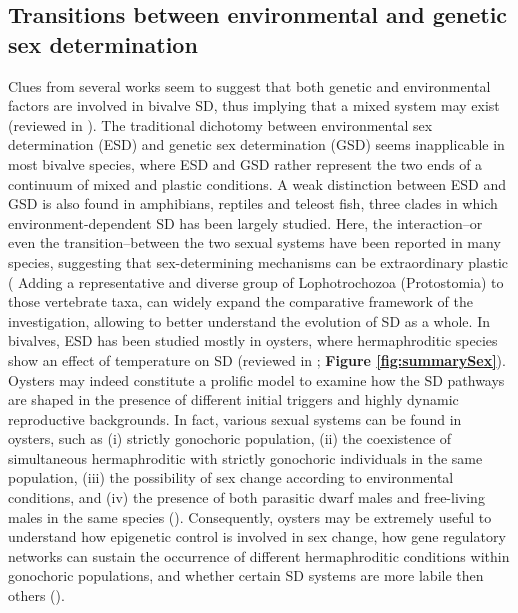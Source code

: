\documentclass[../main.tex]{subfiles}
\begin{document}
\subsection{Transitions between environmental and genetic sex determination}
Clues from several works seem to suggest that both genetic and environmental factors are involved in bivalve SD, thus implying that a mixed system may exist (reviewed in \textbf{\cite{breton2018sex}}). The traditional dichotomy between environmental sex determination (ESD) and genetic sex determination (GSD) seems inapplicable in most bivalve species, where ESD and GSD rather represent the two ends of a continuum of mixed and plastic conditions.  A weak distinction between ESD and GSD is also found in amphibians, reptiles and teleost fish, three clades in which environment-dependent SD has been largely studied. Here, the interaction–or even the transition–between the two sexual systems have been reported in many species, suggesting that sex-determining mechanisms can be extraordinary plastic (\textbf{\cite{bachtrog2014sex, capel2017vertebrate}} Adding a representative and diverse group of Lophotrochozoa (Protostomia) to those vertebrate taxa, can widely expand the comparative framework of the investigation, allowing to better understand the evolution of SD as a whole. In bivalves, ESD has been studied mostly in oysters, where hermaphroditic species show an effect of temperature on SD (reviewed in \textbf{\cite{breton2018sex}}; \textbf{Figure \ref{fig:summarySex}}). Oysters may indeed constitute a prolific model to examine how the SD pathways are shaped in the presence of different initial triggers and highly dynamic reproductive backgrounds. In fact, various sexual systems can be found in oysters, such as (i) strictly gonochoric population, (ii) the coexistence of simultaneous hermaphroditic with strictly gonochoric individuals in the same population, (iii) the possibility of sex change according to environmental conditions, and (iv) the presence of both parasitic dwarf males and free-living males in the same species (\textbf{\cite{collin2013phylogenetic}}). Consequently, oysters may be extremely useful to understand how epigenetic control is involved in sex change, how gene regulatory networks can sustain the occurrence of different hermaphroditic conditions within gonochoric populations, and whether certain SD systems are more labile then others (\textbf{\cite{abbott2011intra}}).
\end{document}

